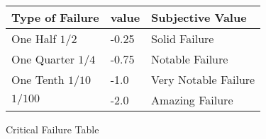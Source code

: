 \begin{SHTable}[H]
	\begin{tabular}{l|l|l}
	Type of Failure				& value & Subjective Value	\\
	\hline
	One Half \( 1/2 \)			& -0.25	& Solid Failure		\\
        One Quarter \( 1/4 \) 	& -0.75	& Notable Failure	\\
        One Tenth \( 1/10 \) 	& -1.0	& Very Notable Failure	\\
        \(1/100\) 				& -2.0	& Amazing Failure	\\
    \end{tabular}
	\caption{Critical Failure Table}\label{Table:CriticalFailure}
\end{SHTable}

